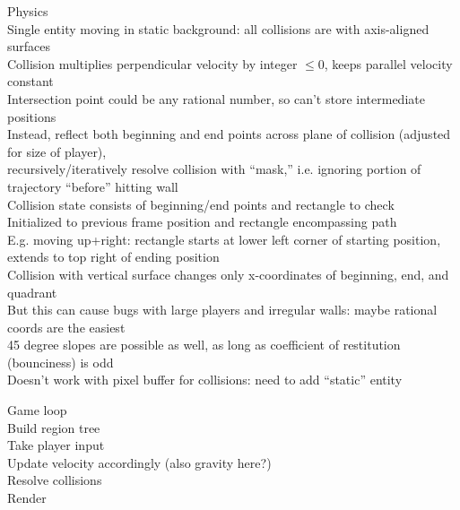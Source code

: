 \documentclass{article}
\begin{document}
Physics \\
Single entity moving in static background:
all collisions are with axis-aligned surfaces \\
Collision multiplies perpendicular velocity by integer $\leq 0$,
keeps parallel velocity constant \\
Intersection point could be any rational number,
so can't store intermediate positions \\
Instead, reflect both beginning and end points across plane of collision
(adjusted for size of player), \\
recursively/iteratively resolve collision with ``mask,''
i.e. ignoring portion of trajectory ``before'' hitting wall \\
Collision state consists of beginning/end points
and rectangle to check \\
Initialized to previous frame position
and rectangle encompassing path \\
E.g. moving up+right: rectangle starts at lower left corner of starting position,
extends to top right of ending position \\
Collision with vertical surface changes only x-coordinates of beginning, end, and quadrant \\
But this can cause bugs with large players and irregular walls:
maybe rational coords are the easiest \\
45 degree slopes are possible as well,
as long as coefficient of restitution (bounciness) is odd \\
Doesn't work with pixel buffer for collisions:
need to add ``static'' entity

Game loop \\
Build region tree \\
Take player input \\
Update velocity accordingly (also gravity here?) \\
Resolve collisions \\
Render \\
\end{document}
